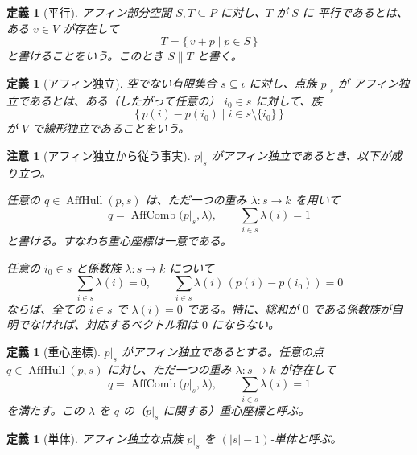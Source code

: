 \documentclass[a4paper,12pt]{bxjsbook}
\theoremstyle{theorem}
\newtheorem{definition}[theorem]{定義}
\newtheorem{remark}[theorem]{注意}
\DeclareMathOperator{\AffHull}{AffHull}
\DeclareMathOperator{\AffComb}{AffComb}
\begin{document}
    \begin{definition}[平行]
        アフィン部分空間 $S,T\subseteq P$ に対し、$T$ が $S$ に \emph{平行}であるとは、ある $v\in V$ が存在して
        \[
          T=\{\,v+p\mid p\in S\,\}
        \]
        と書けることをいう。このとき $S\parallel T$ と書く。
    \end{definition}

    \begin{definition}[アフィン独立]
        空でない有限集合 $s\subseteq \iota$ に対し、点族 $p|_s$ が \emph{アフィン独立}であるとは、ある（したがって任意の） $i_0\in s$ に対して、族
        \[
          \{\,p(i)-p(i_0)\mid i\in s\setminus\{i_0\}\,\}
        \]
        が $V$ で線形独立であることをいう。
    \end{definition}

    \begin{remark}[アフィン独立から従う事実]
        $p|_s$ がアフィン独立であるとき、以下が成り立つ。
        \begin{theoremitemize}[leftmargin=5em, topsep=2pt, partopsep=0pt, itemsep=0pt, parsep=0pt]
            \item 任意の $q\in \AffHull(p,s)$ は、ただ一つの重み $\lambda:s\to k$ を用いて
            \[
              q=\AffComb\bigl(p|_s,\lambda\bigr),
              \qquad
              \sum_{i\in s}\lambda(i)=1
            \]
            と書ける。すなわち重心座標は一意である。
            \item 任意の $i_0\in s$ と係数族 $\lambda:s\to k$ について
            \[
              \sum_{i\in s}\lambda(i)=0,
              \qquad
              \sum_{i\in s}\lambda(i)\,(p(i)-p(i_0))=0
            \]
            ならば、全ての $i\in s$ で $\lambda(i)=0$ である。特に、総和が $0$ である係数族が自明でなければ、対応するベクトル和は $0$ にならない。
        \end{theoremitemize}
    \end{remark}

    \begin{definition}[重心座標]
        $p|_s$ がアフィン独立であるとする。任意の点 $q\in \AffHull(p,s)$ に対し、ただ一つの重み $\lambda:s\to k$ が存在して
        \[
          q=\AffComb\bigl(p|_s,\lambda\bigr),
          \qquad
          \sum_{i\in s}\lambda(i)=1
        \]
        を満たす。この $\lambda$ を $q$ の（$p|_s$ に関する）\emph{重心座標}と呼ぶ。
    \end{definition}

    \begin{definition}[単体]
        アフィン独立な点族 $p|_s$ を \emph{$(|s|-1)$-単体}と呼ぶ。
    \end{definition}
\end{document}
